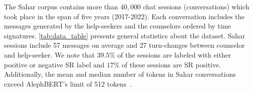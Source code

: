 \documentclass[letterpaper]{article} %
\newcommand{\kibitz}[2]{\ifnum\Comments=1{\textcolor{#1}{#2}}\fi}
\newcommand{\kg}[1]{\kibitz{red}{[KG:#1]}}
\newcommand{\di}[1]{\kibitz{blue}{[DI:#1]}}
\begin{document}
The Sahar corpus contains more than $40,000$  chat sessions (conversations) which took place in the span of  five years (2017-2022). Each conversation includes the  messages generated by the help-seekers and the counselors ordered by time signatures. \autoref{tab:data_table} presents general statistics about the dataset.
Sahar sessions include 57 messages on average and 27 turn-changes between counselor and help-seeker.
We note that $39.5\%$ of the sessions are labeled with either positive or negative SR label and $17\%$ of these sessions are SR positive. Additionally, the mean and median number of tokens in Sahar conversations exceed AlephBERT's limit of 512 tokens~\cite{seker2022alephbert}.



\begin{table}[]
    \begin{center}{
    \caption{General statistics for Sahar corpus}
        \label{tab:data_table}
    }\end{center}

\end{table}
\end{document}
